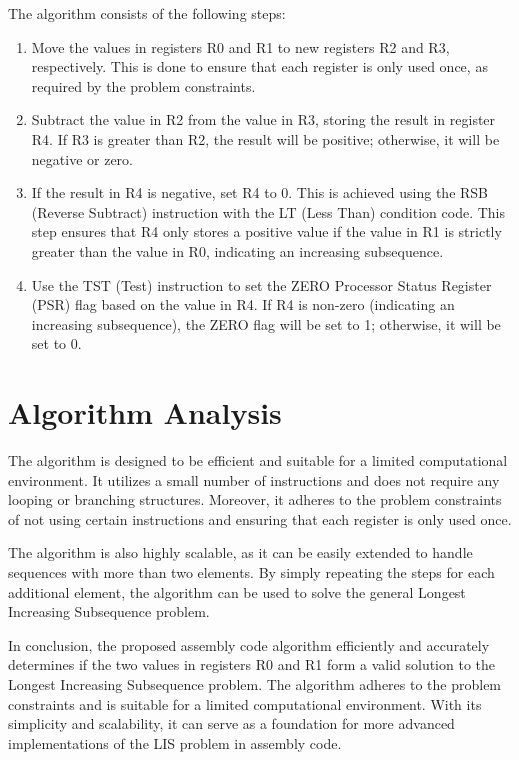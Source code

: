 The algorithm consists of the following steps:

\begin{enumerate}
\item Move the values in registers R0 and R1 to new registers R2 and R3, respectively. This is done to ensure that each register is only used once, as required by the problem constraints.

\item Subtract the value in R2 from the value in R3, storing the result in register R4. If R3 is greater than R2, the result will be positive; otherwise, it will be negative or zero.

\item If the result in R4 is negative, set R4 to 0. This is achieved using the RSB (Reverse Subtract) instruction with the LT (Less Than) condition code. This step ensures that R4 only stores a positive value if the value in R1 is strictly greater than the value in R0, indicating an increasing subsequence.

\item Use the TST (Test) instruction to set the ZERO Processor Status Register (PSR) flag based on the value in R4. If R4 is non-zero (indicating an increasing subsequence), the ZERO flag will be set to 1; otherwise, it will be set to 0.
\end{enumerate}

\section{Algorithm Analysis}

The algorithm is designed to be efficient and suitable for a limited computational environment. It utilizes a small number of instructions and does not require any looping or branching structures. Moreover, it adheres to the problem constraints of not using certain instructions and ensuring that each register is only used once.

The algorithm is also highly scalable, as it can be easily extended to handle sequences with more than two elements. By simply repeating the steps for each additional element, the algorithm can be used to solve the general Longest Increasing Subsequence problem.

In conclusion, the proposed assembly code algorithm efficiently and accurately determines if the two values in registers R0 and R1 form a valid solution to the Longest Increasing Subsequence problem. The algorithm adheres to the problem constraints and is suitable for a limited computational environment. With its simplicity and scalability, it can serve as a foundation for more advanced implementations of the LIS problem in assembly code.



